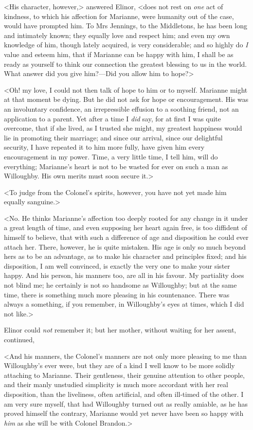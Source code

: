 <His character, however,> answered Elinor, <does not rest on \textit{one} act of kindness, to which his affection for Marianne, were humanity out of the case, would have prompted him. To Mrs Jennings, to the Middletons, he has been long and intimately known; they equally love and respect him; and even my own knowledge of him, though lately acquired, is very considerable; and so highly do \textit{I} value and esteem him, that if Marianne can be happy with him, I shall be as ready as yourself to think our connection the greatest blessing to us in the world. What answer did you give him?—Did you allow him to hope?>

<Oh! my love, I could not then talk of hope to him or to myself. Marianne might at that moment be dying. But he did not ask for hope or encouragement. His was an involuntary confidence, an irrepressible effusion to a soothing friend, not an application to a parent. Yet after a time I \textit{did} say, for at first I was quite overcome, that if she lived, as I trusted she might, my greatest happiness would lie in promoting their marriage; and since our arrival, since our delightful security, I have repeated it to him more fully, have given him every encouragement in my power. Time, a very little time, I tell him, will do everything; Marianne's heart is not to be wasted for ever on such a man as Willoughby. His own merits must soon secure it.>

<To judge from the Colonel's spirits, however, you have not yet made him equally sanguine.>

<No. He thinks Marianne's affection too deeply rooted for any change in it under a great length of time, and even supposing her heart again free, is too diffident of himself to believe, that with such a difference of age and disposition he could ever attach her. There, however, he is quite mistaken. His age is only so much beyond hers as to be an advantage, as to make his character and principles fixed; and his disposition, I am well convinced, is exactly the very one to make your sister happy. And his person, his manners too, are all in his favour. My partiality does not blind me; he certainly is not so handsome as Willoughby; but at the same time, there is something much more pleasing in his countenance. There was always a something, if you remember, in Willoughby's eyes at times, which I did not like.>

Elinor could \textit{not} remember it; but her mother, without waiting for her assent, continued,

<And his manners, the Colonel's manners are not only more pleasing to me than Willoughby's ever were, but they are of a kind I well know to be more solidly attaching to Marianne. Their gentleness, their genuine attention to other people, and their manly unstudied simplicity is much more accordant with her real disposition, than the liveliness, often artificial, and often ill-timed of the other. I am very sure myself, that had Willoughby turned out as really amiable, as he has proved himself the contrary, Marianne would yet never have been so happy with \textit{him} as she will be with Colonel Brandon.>

